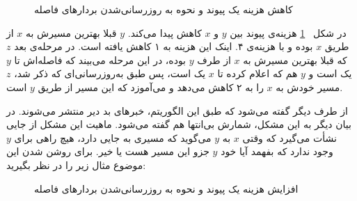  \begin{figure}[H]
\centering
{}
\caption{کاهش هزینه یک پیوند و نحوه به روزرسانی‌شدن بردار‌های فاصله}
\label{fig:goodnews}
\end{figure}
 

 در شکل 
 ~\ref{fig:goodnews}
 هزینه‌ی پیوند بین $y$ و $x$ کاهش پیدا می‌کند. $y$ قبلا بهترین مسیرش به $x$ از طریق $x$ بوده و با هزینه‌ی ۴. اینک این هزینه به ۱ کاهش یافته است. در مرحله‌ی بعد $z$ که قبلا بهترین مسیرش به $x$ از طرف $y$ بوده، در این مرحله می‌بیند که فاصله‌اش تا $y$ یک است و $y$ هم که اعلام کرده تا $x$ یک است، پس طبق به‌روزرسانی‌ای که ذکر شد، $z$  مسیر خودش به $x$ را به ۲ کاهش می‌دهد و می‌آموزد که این مسیر از طریق $y$ است. 
 
 از طرف دیگر گفته می‌شود که طبق این الگوریتم، خبرهای بد دیر منتشر می‌شوند. در بیان دیگر به این مشکل، شمارش بی‌انتها هم گفته می‌شود. ماهیت این مشکل از جایی نشأت می‌گیرد که وقتی $x$ به $y$ می‌گوید که مسیری به جایی دارد، هیچ راهی برای $y$ وجود ندارد که بفهمد آیا خود $y$ جزو این مسیر هست یا خیر. برای روشن شدن این موضوع مثال زیر را در نظر بگیرید: 
 
 \begin{figure}[H]
\centering
{}
\caption{افزایش هزینه یک پیوند و نحوه به روزرسانی‌شدن بردار‌های فاصله}
\label{fig:badnews}
\end{figure}
 
